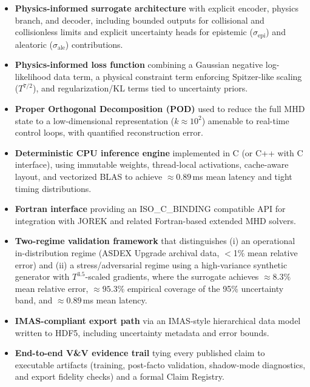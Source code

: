 \documentclass[11pt]{article}
\begin{document}
\begin{itemize}
  \item \textbf{Physics-informed surrogate architecture} with explicit encoder, physics branch, and decoder, including bounded outputs for collisional and collisionless limits and explicit uncertainty heads for epistemic ($\sigma_{\mathrm{epi}}$) and aleatoric ($\sigma_{\mathrm{ale}}$) contributions.

  \item \textbf{Physics-informed loss function} combining a Gaussian negative log-likelihood data term, a physical constraint term enforcing Spitzer-like scaling ($T^{7/2}$), and regularization/KL terms tied to uncertainty priors.

  \item \textbf{Proper Orthogonal Decomposition (POD)} used to reduce the full MHD state to a low-dimensional representation ($k \approx 10^2$) amenable to real-time control loops, with quantified reconstruction error.

  \item \textbf{Deterministic CPU inference engine} implemented in C (or C++ with C interface), using immutable weights, thread-local activations, cache-aware layout, and vectorized BLAS to achieve $\approx 0.89$\,ms mean latency and tight timing distributions.

  \item \textbf{Fortran interface} providing an ISO\_C\_BINDING compatible API for integration with JOREK and related Fortran-based extended MHD solvers.

  \item \textbf{Two-regime validation framework} that distinguishes (i) an operational in-distribution regime (ASDEX Upgrade archival data, $<$1\% mean relative error) and (ii) a stress/adversarial regime using a high-variance synthetic generator with $T^{3.5}$-scaled gradients, where the surrogate achieves $\approx 8.3\%$ mean relative error, $\approx 95.3\%$ empirical coverage of the 95\% uncertainty band, and $\approx 0.89$\,ms mean latency.

  \item \textbf{IMAS-compliant export path} via an IMAS-style hierarchical data model written to HDF5, including uncertainty metadata and error bounds.

  \item \textbf{End-to-end V\&V evidence trail} tying every published claim to executable artifacts (training, post-facto validation, shadow-mode diagnostics, and export fidelity checks) and a formal Claim Registry.
\end{itemize}
\end{document}
